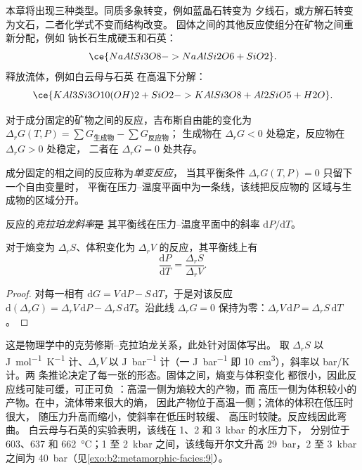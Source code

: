 本章将出现三种类型。同质多象转变，例如蓝晶石转变为
夕线石，或方解石转变为文石，二者化学式不变而结构改变。
固体之间的其他反应使组分在矿物之间重新分配，例如
钠长石生成硬玉和石英：
\[
\ce{NaAlSi3O8 -> NaAlSi2O6 + SiO2}.
\]
释放流体，例如白云母与石英
在高温下分解：
\[
\ce{KAl3Si3O10(OH)2 + SiO2 -> KAlSi3O8 + Al2SiO5 + H2O}.
\]

对于成分固定的矿物之间的反应，吉布斯自由能的变化为
$\Delta_r G(T, P) = \sum G_{\text{生成物}} - \sum G_{\text{反应物}}$；
生成物在 $\Delta_r G < 0$ 处稳定，反应物在 $\Delta_r G > 0$ 处稳定，
二者在 $\Delta_r G = 0$ 处共存。

\begin{definition}[单变反应]\label{def:b2:metamorphic-facies:univariant}
成分固定的相之间的反应称为\emph{单变反应}，
当其平衡条件 $\Delta_r G(T, P) = 0$ 只留下一个自由变量时，
平衡在压力–温度平面中为一条线，该线把反应物的
区域与生成物的区域分开。
\end{definition}

\begin{definition}[克拉珀龙斜率]\label{def:b2:metamorphic-facies:clapeyron}
反应的\emph{克拉珀龙斜率}是
其平衡线在压力–温度平面中的斜率 $\mathrm dP/\mathrm dT$。
\end{definition}

\begin{proposition}[反应的克拉珀龙斜率]\label{prop:b2:metamorphic-facies:clapeyron}
对于熵变为 $\Delta_r S$、体积变化为
$\Delta_r V$ 的反应，其平衡线上有
\[
\frac{\mathrm dP}{\mathrm dT} = \frac{\Delta_r S}{\Delta_r V}.
\]
\end{proposition}

\begin{proof}
对每一相有 $\mathrm dG = V\,\mathrm dP - S\,\mathrm dT$，于是对该反应
$\mathrm d(\Delta_r G) = \Delta_r V\,\mathrm dP - \Delta_r S\,\mathrm dT$。沿此线
$\Delta_r G = 0$ 保持为零：$\Delta_r V\,\mathrm dP = \Delta_r S\,\mathrm dT$。
\end{proof}

这是物理学中的克劳修斯–克拉珀龙关系，此处针对固体写出。
取 $\Delta_r S$ 以 \unit{J.mol^{-1}.K^{-1}} 计、$\Delta_r V$ 以 \unit{J.bar^{-1}} 计（一
\unit{J.bar^{-1}} 即 \qty{10}{cm^3}），斜率以 bar/K 计。两
条推论决定了每一张的形态。固体之间，熵变与体积变化
都很小，因此反应线可陡可缓，可正可负
：高温一侧为熵较大的产物，而
高压一侧为体积较小的产物。在中，流体带来很大的熵，
因此产物位于高温一侧；流体的体积在低压时很大，
随压力升高而缩小，使斜率在低压时较缓、
高压时较陡。反应线因此弯曲。
白云母与石英的实验表明，该线在 1、2 和 \qty{3}{kbar} 的水压力下，
分别位于 603、637 和 \qty{662}{\celsius}；1 至 \qty{2}{kbar} 之间，该线每开尔文升高
\qty{29}{bar}，2 至 \qty{3}{kbar} 之间为 \qty{40}{bar}（见\cref{exo:b2:metamorphic-facies:9}）。

